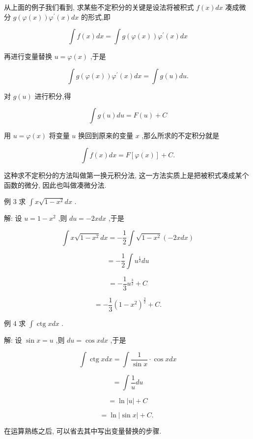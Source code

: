 \documentclass[lang=cn,newtx,10pt,scheme=chinese]{elegantbook}
\begin{document}
\begin{proposition}[第一换元积分法]

从上面的例子我们看到, 求某些不定积分的关键是设法将被积式 \(f\left( x\right) {dx}\) 凑成微分 \(g\left( {\varphi \left( x\right) }\right) {\varphi }^{\prime }\left( x\right) {dx}\) 的形式,即

\[
\int f\left( x\right) {dx} = \int g\left( {\varphi \left( x\right) }\right) {\varphi }^{\prime }\left( x\right) {dx}
\]

再进行变量替换 \(u = \varphi \left( x\right)\) ,于是

\[
\int g\left( {\varphi \left( x\right) }\right) {\varphi }^{\prime }\left( x\right) {dx} = \int g\left( u\right) {du}.
\]

对 \(g\left( u\right)\) 进行积分,得

\[
\int g\left( u\right) {du} = F\left( u\right) + C
\]

用 \(u = \varphi \left( x\right)\) 将变量 \(u\) 换回到原来的变量 \(x\) ,那么所求的不定积分就是

\[
\int f\left( x\right) {dx} = F\left\lbrack {\varphi \left( x\right) }\right\rbrack + C.
\]

这种求不定积分的方法叫做第一换元积分法, 这一方法实质上是把被积式凑成某个函数的微分, 因此也叫做凑微分法.

\end{proposition}

例 3 求 \(\int x\sqrt{1 - {x}^{2}}{dx}\) .

解: 设 \(u = 1 - {x}^{2}\) ,则 \({du} = - {2xdx}\) ,于是

\[
\int x\sqrt{1 - {x}^{2}}{dx} = - \frac{1}{2}\int \sqrt{1 - {x}^{2}}\left( {-{2xdx}}\right)
\]

\[
= - \frac{1}{2}\int {u}^{\frac{1}{2}}{du}
\]

\[
= - \frac{1}{3}{u}^{\frac{3}{2}} + C
\]

\[
= - \frac{1}{3}{\left( 1 - {x}^{2}\right) }^{\frac{3}{2}} + C\text{.}
\]

例 4 求 \(\int \operatorname{ctg}{xdx}\) .

解: 设 \(\sin x = u\) ,则 \({du} = \cos {xdx}\) ,于是

\[
\int \operatorname{ctg}{xdx} = \int \frac{1}{\sin x} \cdot \cos {xdx}
\]

\[
= \int \frac{1}{u}{du}
\]

\[
= \ln \left| u\right| + C
\]

\[
= \ln \left| {\sin x}\right| + C\text{. }
\]

在运算熟练之后, 可以省去其中写出变量替换的步骤.
\end{document}

